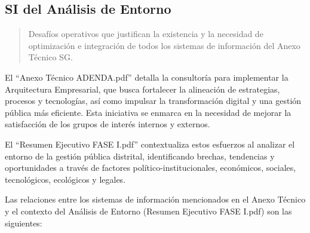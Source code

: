 \documentclass[
	a4paper, %
	12pt, %
]{include/CSSullivanBusinessReport}
\begin{document}
\subsection{SI del Análisis de
Entorno}\label{sec:si-del-anuxe1lisis-de-entorno}

\begin{quote}
Desafíos operativos que justifican la existencia y la necesidad de
optimización e integración de todos los sistemas de información del
Anexo Técnico SG.
\end{quote}

El ``Anexo Técnico ADENDA.pdf'' detalla la consultoría para implementar
la Arquitectura Empresarial, que busca fortalecer la alineación de
estrategias, procesos y tecnologías, así como impulsar la transformación
digital y una gestión pública más eficiente. Esta iniciativa se enmarca
en la necesidad de mejorar la satisfacción de los grupos de interés
internos y externos.

El ``Resumen Ejecutivo FASE I.pdf'' contextualiza estos esfuerzos al
analizar el entorno de la gestión pública distrital, identificando
brechas, tendencias y oportunidades a través de factores
político-institucionales, económicos, sociales, tecnológicos, ecológicos
y legales.

Las relaciones entre los sistemas de información mencionados en el Anexo
Técnico y el contexto del Análisis de Entorno (Resumen Ejecutivo FASE
I.pdf) son las siguientes:
\end{document}
